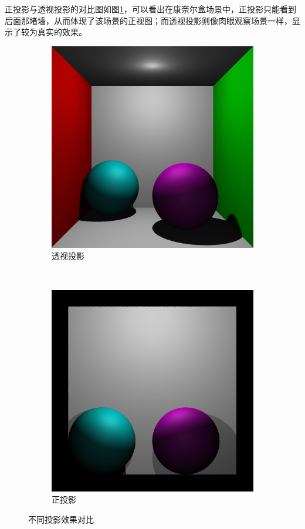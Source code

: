 正投影与透视投影的对比图如图\ref{fig:proj}，可以看出在康奈尔盒场景中，正投影只能看到后面那堵墙，从而体现了该场景的正视图；而透视投影则像肉眼观察场景一样，显示了较为真实的效果。
\begin{figure}
    \centering
    \begin{subfigure}{0.45\textwidth}
        \includegraphics[width=\textwidth]{./img/perspective.png}
        \caption{透视投影}
    \end{subfigure}
    ~
    \begin{subfigure}{0.45\textwidth}
        \includegraphics[width=\textwidth]{./img/ortho.png}
        \caption{正投影}
    \end{subfigure}
    \caption{不同投影效果对比}
    \label{fig:proj}
\end{figure}

